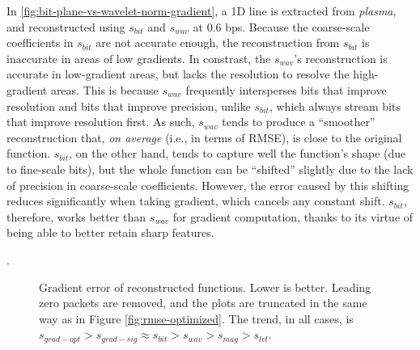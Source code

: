 In \autoref{fig:bit-plane-vs-wavelet-norm-gradient}, a 1D line is extracted from \emph{plasma}, and
reconstructed using $s_{bit}$ and $s_{wav}$ at 0.6 bps. Because the coarse-scale coefficients in
$s_{bit}$ are not accurate enough, the reconstruction from $s_{bit}$ is inaccurate in areas of low
gradients. In constrast, the $s_{wav}$'s reconstruction is accurate in low-gradient areas, but lacks
the resolution to resolve the high-gradient areas. This is because $s_{wav}$ frequently intersperses
bits that improve resolution and bits that improve precision, unlike $s_{bit}$, which always stream
bits that improve resolution first. As such, $s_{wav}$ tends to produce a ``smoother''
reconstruction that, \emph{on average} (i.e., in terms of RMSE), is close to the original function.
$s_{bit}$, on the other hand, tends to capture well the function's shape (due to fine-scale bits),
but the whole function can be ``shifted'' slightly due to the lack of precision in coarse-scale
coefficients. However, the error caused by this shifting reduces significantly when taking gradient,
which cancels any constant shift. $s_{bit}$, therefore, works better than $s_{wav}$ for gradient
computation, thanks to its virtue of being able to better retain sharp features.

.

\begin{figure}[t]
	\centering
	 \caption{Gradient
	error of reconstructed functions. Lower is better. Leading zero packets are removed, and the plots
	are truncated in the same way as in Figure \ref{fig:rmse-optimized}. The trend, in all cases, is
	$s_{grad-opt} > s_{grad-sig} \approx s_{bit} > s_{wav} > s_{mag} > s_{lvl}$.}
	\label{fig:gradient-error-comparison}
\end{figure}

